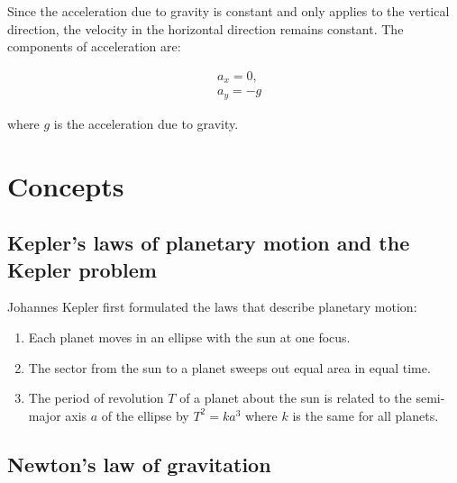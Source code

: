 \begin{frame}{\subsecname}

Since the acceleration due to gravity is constant and only applies to the vertical direction, the velocity in the horizontal direction remains constant. The components of acceleration are:

\begin{align}
& a_x = 0, \\ 
& a_y = -g
\end{align}

where \(g\) is the acceleration due to gravity.

\end{frame}

\section{Concepts}

\subsection{Kepler's laws of planetary motion and the Kepler problem}

\begin{frame}{\subsecname}

Johannes Kepler first formulated the laws that describe planetary motion:

\begin{enumerate}

\item Each planet moves in an ellipse with the sun at one focus.\footnotemark

\item The sector from the sun to a planet sweeps out equal area in equal time.

\item The period of revolution \(T\) of a planet about the sun is related to the semi-major axis \(a\) of the ellipse by \(T^2 = ka^3\) where \(k\) is the same for all planets.
\end{enumerate}


\end{frame}

\subsection{Newton's law of gravitation}

